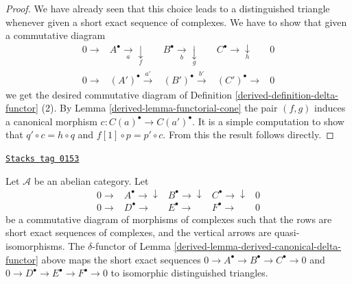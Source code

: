 \begin{proof}

We have already seen that this choice leads to a distinguished
triangle whenever given a short exact sequence of complexes.
We have to show that given a commutative diagram
$$
\begin{array}{ccccc}0 \longrightarrow & A^\bullet \underset{a}{\longrightarrow}\underset{f}{\downarrow} & B^\bullet \underset{b}{\longrightarrow}\underset{g}{\downarrow} & C^\bullet \longrightarrow\underset{h}{\downarrow} & 0 \\ 0 \longrightarrow & (A')^\bullet \overset{a'}{\longrightarrow} & (B')^\bullet \overset{b'}{\longrightarrow} & (C')^\bullet \longrightarrow & 0\end{array}
$$
we get the desired commutative diagram of
Definition \ref{derived-definition-delta-functor} (2).
By Lemma \ref{derived-lemma-functorial-cone}
the pair $(f, g)$ induces a canonical morphism
$c : C(a)^\bullet \to C(a')^\bullet$. It is a simple computation
to show that $q' \circ c = h \circ q$ and
$f[1] \circ p = p' \circ c$. From this the result follows directly.
\end{proof}

\begin{lemma}
\label{derived-lemma-derived-compare-triangles-ses}
\href{https://stacks.math.columbia.edu/tag/0153}{\texttt{Stacks tag 0153}}

Let $\mathcal{A}$ be an abelian category.
Let
$$
\begin{array}{ccccc}0 \longrightarrow & A^\bullet \longrightarrow\downarrow & B^\bullet \longrightarrow\downarrow & C^\bullet \longrightarrow\downarrow & 0 \\ 0 \longrightarrow & D^\bullet \longrightarrow & E^\bullet \longrightarrow & F^\bullet \longrightarrow & 0\end{array}
$$
be a commutative diagram of morphisms of complexes
such that the rows are short exact sequences of complexes, and
the vertical arrows are quasi-isomorphisms.
The $\delta$-functor of
Lemma \ref{derived-lemma-derived-canonical-delta-functor}
above maps the short exact sequences
$0 \to A^\bullet \to B^\bullet \to C^\bullet \to 0$
and
$0 \to D^\bullet \to E^\bullet \to F^\bullet \to 0$
to isomorphic distinguished triangles.
\end{lemma}

